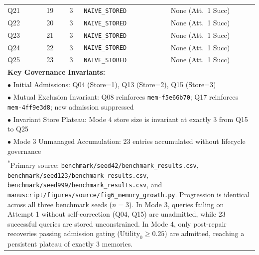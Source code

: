 \begin{table}[t]
\begin{tabular}{lccll}
Q21 & 19 & 3 & \texttt{NAIVE\_STORED} & None (Att.~1 Succ) \\
Q22 & 20 & 3 & \texttt{NAIVE\_STORED} & None (Att.~1 Succ) \\
Q23 & 21 & 3 & \texttt{NAIVE\_STORED} & None (Att.~1 Succ) \\
Q24 & 22 & 3 & \texttt{NAIVE\_STORED} & None (Att.~1 Succ) \\
Q25 & 23 & 3 & \texttt{NAIVE\_STORED} & None (Att.~1 Succ) \\
\midrule
\multicolumn{5}{l}{\textbf{Key Governance Invariants:}} \\
\multicolumn{5}{l}{$\bullet$ Initial Admissions: Q04 (Store=1), Q13 (Store=2), Q15 (Store=3)} \\
\multicolumn{5}{l}{$\bullet$ Mutual Exclusion Invariant: Q08 reinforces \texttt{mem-f5e66b70}; Q17 reinforces \texttt{mem-4ff9e3d8}; new admission suppressed} \\
\multicolumn{5}{l}{$\bullet$ Invariant Store Plateau: Mode 4 store size is invariant at exactly 3 from Q15 to Q25} \\
\multicolumn{5}{l}{$\bullet$ Mode 3 Unmanaged Accumulation: 23 entries accumulated without lifecycle governance} \\
\bottomrule
\multicolumn{5}{p{8.3cm}}{\scriptsize \textsuperscript{*}Primary source: \texttt{benchmark/seed42/benchmark\_results.csv}, \texttt{benchmark/seed123/benchmark\_results.csv}, \texttt{benchmark/seed999/benchmark\_results.csv}, and \texttt{manuscript/figures/source/fig6\_memory\_growth.py}. Progression is identical across all three benchmark seeds ($n = 3$). In Mode 3, queries failing on Attempt 1 without self-correction (Q04, Q15) are unadmitted, while 23 successful queries are stored unconstrained. In Mode 4, only post-repair recoveries passing admission gating ($\text{Utility}_0 \ge 0.25$) are admitted, reaching a persistent plateau of exactly 3 memories.} \\
\end{tabular}
\end{table}
